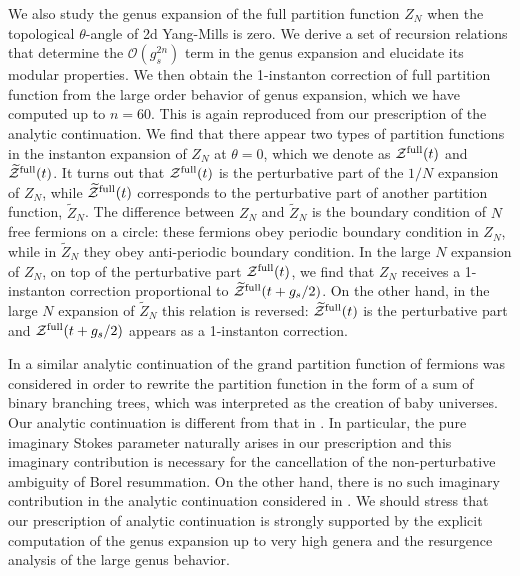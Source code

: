 \documentclass[11pt]{article}
\def\th{\theta}
\renewcommand{\[}{\begin{eqnarray}}
\renewcommand{\]}{\end{eqnarray}}
\newcommand{\tZ}{{\widetilde Z}}
\newcommand{\Zefull}{{\cal Z}^{\text{full}}}
\newcommand{\Zofull}{{\widetilde{\cal Z}}^{\text{full}}}
\begin{document}
We also study the genus expansion of the full partition function $Z_N$
when the topological $\th$-angle of 2d Yang-Mills is zero.
We derive a set of recursion relations
that determine the $\mathcal{O}(g_s^{2n})$ term in the
genus expansion and elucidate its modular properties.
We then obtain the 1-instanton correction of full
partition function from the large order behavior
of genus expansion, which we have computed up to $n=60$.
This is again reproduced from
our prescription of the analytic continuation. 
We find that there appear two types of partition functions
in the instanton expansion of $Z_N$ at $\th=0$, which we denote
as $\Zefull(t)$ and $\Zofull(t)$.
It turns out that $\Zefull(t)$ is the perturbative part of the
$1/N$ expansion of $Z_N$, while $\Zofull(t)$
corresponds to the perturbative part of another partition function,
$\tZ_N$. The difference between $Z_N$ and $\tZ_N$
is the boundary condition of $N$
free fermions on a circle: these fermions obey periodic boundary condition
in  $Z_N$, while
in $\tZ_N$ they obey anti-periodic boundary condition.
In the large $N$ expansion of $Z_N$,
on top of the perturbative part
$\Zefull(t)$,  we find that $Z_N$ receives a 1-instanton correction
proportional to
$\Zofull(t+g_s/2)$. On the other hand, in the large $N$ expansion of $\tZ_N$
this relation is reversed:
$\Zofull(t)$ is the perturbative part and $\Zefull(t+g_s/2)$ appears as a 1-instanton
correction.

In \cite{Dijkgraaf:2005bp} a similar analytic continuation of
the grand partition function of fermions was considered 
in order to rewrite the partition function in the form of
a sum of binary branching trees, which was interpreted as the creation of baby universes.
Our analytic continuation is different from that in \cite{Dijkgraaf:2005bp}.
In particular, the pure imaginary Stokes parameter naturally
arises in our prescription 
and this imaginary contribution is necessary
for the cancellation of the non-perturbative ambiguity of Borel resummation.
On the other hand, there is no such imaginary contribution in the 
analytic continuation considered in \cite{Dijkgraaf:2005bp}.
We should stress that our prescription 
of analytic continuation is strongly
supported by the explicit computation of the genus expansion
up to very high genera and 
the resurgence analysis of the large genus behavior.
\end{document}
